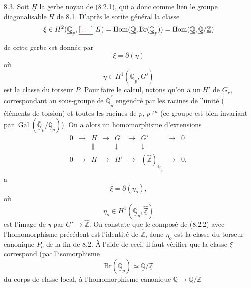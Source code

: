 \documentclass[11pt,a4paper]{article}
\begin{document}
8.3. \quad Soit $\underline{H}$ la gerbe noyau de (8.2.1), qui a donc comme
lien le groupe diagonalisable $H$ de 8.1. D'après le sorite général la classe
\[
\xi \in H^{2}(\underline{\mathbb{Q}}_{p}, \struck{\ill{}}\ H)
= \operatorname{Hom}(\underline{\mathbb{Q}}, \mathrm{Br}(\underline{\mathbb{Q}}_{p}))
= \operatorname{Hom}(\underline{\mathbb{Q}}, \underline{\mathbb{Q}}/\underline{\mathbb{Z}})
\]
de cette gerbe est donnée par
\[
\xi = \partial(\eta)
\]
où
\[
\eta \in H^{1}(\underline{\mathbb{Q}}_{p}, G')
\]
est la classe du torseur $P$. Pour faire le calcul, notons qu'on a un
  $H'$ de $G_{r}$, correspondant au
sous-groupe de $\bar{\underline{\mathbb{Q}}}^{*}_{p}$  engendré
par les racines de l'unité (= éléments de torsion) et toutes les racines de
$p$, $p^{1/n}$ (ce groupe est bien invariant par
$\operatorname{Gal}(\bar{\underline{\mathbb{Q}}}_{p}/\underline{\mathbb{Q}}_{p})$).
On a alors un homomorphisme d'extensions
\[
\begin{array}{ccccccccc}
0 &\longrightarrow& H &\longrightarrow& G &\longrightarrow& G' &\longrightarrow& 0 \\
 && \big\| && \downarrow && \downarrow && \\
0 &\longrightarrow& H &\longrightarrow& H' &\longrightarrow& (\hat{\underline{\mathbb{Z}}})_{\underline{\mathbb{Q}}_{p}} &\longrightarrow& 0 ,
\end{array}
\]
 \struck{\ill{}} a
\[
\xi = \partial(\eta_{o}) ,
\]
où
\[
\eta_{o} \in H^{1}(\underline{\mathbb{Q}}_{p}, \hat{\underline{\mathbb{Z}}})
\]
est l'image de $\eta$ par $G' \to \hat{\underline{\mathbb{Z}}}$. On constate
que le composé de (8.2.2) avec l'homomorphisme précédent est l'identité de
$\hat{\underline{\mathbb{Z}}}$, donc $\eta_{o}$ est la classe du torseur
canonique $P_{o}$ de la fin de 8.2. À l'aide de ceci, il faut vérifier que la
classe $\xi$ correspond (par l'isomorphisme
\[
\mathrm{Br}(\underline{\mathbb{Q}}_{p}) \simeq
\underline{\mathbb{Q}}/\underline{\mathbb{Z}}
\]
du corps de classe local, à l'homomorphisme canonique
$\underline{\mathbb{Q}} \to \underline{\mathbb{Q}}/\underline{\mathbb{Z}}$

\end{document}
